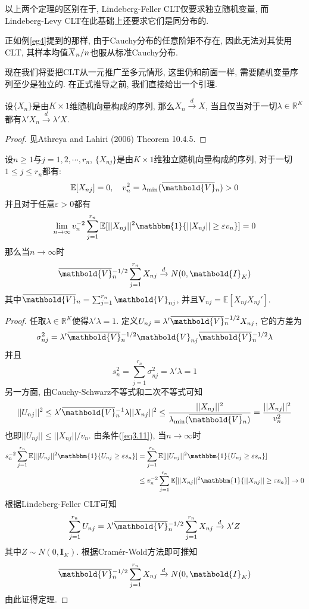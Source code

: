 \documentclass[cn, 12pt, math=mtpro2, bibstyle=apa, blue, twocol]{elegantbook}
\newcommand{\R}{\mathbb{R}}
\newcommand{\E}{\mathbb{E}}
\newcommand{\V}{\mathbold{V}}
\newcommand{\limn}{\lim_{n\to\infty}}
\newcommand{\overbar}[1]{\mkern 1.5mu\overline{\mkern-1.5mu#1\mkern-1.5mu}\mkern 1.5mu}
\begin{document}
\begin{remark}
以上两个定理的区别在于, Lindeberg-Feller CLT仅要求独立随机变量, 而Lindeberg-Levy CLT在此基础上还要求它们是同分布的.
\end{remark}
\begin{example}
正如例\ref{eg4}提到的那样, 由于Cauchy分布的任意阶矩不存在, 因此无法对其使用CLT, 其样本均值$\overbar{X}_n/n$也服从标准Cauchy分布.
\end{example}
现在我们将要把CLT从一元推广至多元情形, 这里仍和前面一样, 需要随机变量序列至少是独立的. 在正式推导之前, 我们直接给出一个引理.
\begin{lemma}
设$\{X_n\}$是由$K\times1$维随机向量构成的序列, 那么$X_n\xrightarrow{d}X$, 当且仅当对于一切$\lambda\in\R^K$都有$\lambda'X_n\xrightarrow{d}\lambda'X$.
\end{lemma}
\begin{proof}
  见Athreya and Lahiri (2006) Theorem 10.4.5.
\end{proof}
\begin{theorem}
  设$n\ge1$与$j=1,2,\cdots,r_n$, $\{X_{nj}\}$是由$K\times1$维独立随机向量构成的序列, 对于一切$1\leq j\leq r_n$都有:
    $$\E[X_{nj}]=0,\quad v_n^2=\lambda_{\min}(\overbar{\V}_n)>0$$
    并且对于任意$\varepsilon>0$都有
    \begin{equation}\label{eq3.11}
      \limn v_n^{-2}\sum_{j=1}^{r_n}\E[||X_{nj}||^2\mathbbm{1}\{||X_{nj}||\geq\varepsilon v_n\}]=0
    \end{equation}
    那么当$n\to\infty$时
    $$\overbar{\V}_n^{-1/2}\sum_{j=1}^{r_n}X_{nj}\xrightarrow{d}N(0,\mathbold{I}_K)$$
    其中$\overbar{\V}_n=\sum_{j=1}^{r_n}\V_{nj}$, 并且$\V_{nj}=\E[X_{nj}X_{nj}']$.
\end{theorem}
\begin{proof}
  任取$\lambda\in\R^K$使得$\lambda'\lambda=1$. 定义$U_{nj}=\lambda'\overbar{\V}_n^{-1/2}X_{nj}$, 它的方差为
  $$\sigma^2_ {nj}=\lambda'\overbar{\V}_n^{-1/2}\V_{nj}\overbar{\V}_n^{-1/2}\lambda$$
  并且
  $$s_n^2=\sum_{j=1}^{r_n}\sigma_{nj}^2=\lambda'\lambda=1$$
  另一方面, 由Cauchy-Schwarz不等式和二次不等式可知
  $$||U_{nj}||^2\leq\lambda'\overbar{\V}_n^{-1}\lambda||X_{nj}||^2\leq\frac{||X_{nj}||^2}{\lambda_{\min}(\overbar{\V}_n)}=\frac{||X_{nj}||^2}{v_n^2}$$
  也即$||U_{nj}||\leq||X_{nj}||/v_n$. 由条件(\ref{eq3.11}), 当$n\to\infty$时
  \begin{align*}
  s_n^{-2}\sum_{j=1}^{r_n}\E[||U_{nj}||^2\mathbbm{1}\{U_{nj}\geq\varepsilon s_n\}]&=\sum_{j=1}^{r_n}\E[||U_{nj}||^2\mathbbm{1}\{U_{nj}\geq\varepsilon s_n\}]\\
  &\leq v_n^{-2}\sum_{j=1}^{r_n}\E[||X_{nj}||^2\mathbbm{1}\{||X_{nj}||\geq\varepsilon v_n\}]\to0
  \end{align*}
  根据Lindeberg-Feller CLT可知
  $$\sum_{j=1}^{r_n}U_{nj}=\lambda'\overbar{\V}_n^{-1/2}\sum_{j=1}^{r_n}X_{nj}\xrightarrow{d}\lambda'Z$$
  其中$Z\sim N(0,\mathbold{I}_K)$. 根据Cram\'{e}r-Wold方法即可推知
  $$\overbar{\V}_n^{-1/2}\sum_{j=1}^{r_n}X_{nj}\xrightarrow{d}N(0,\mathbold{I}_K)$$
  由此证得定理.
\end{proof}
\end{document}
